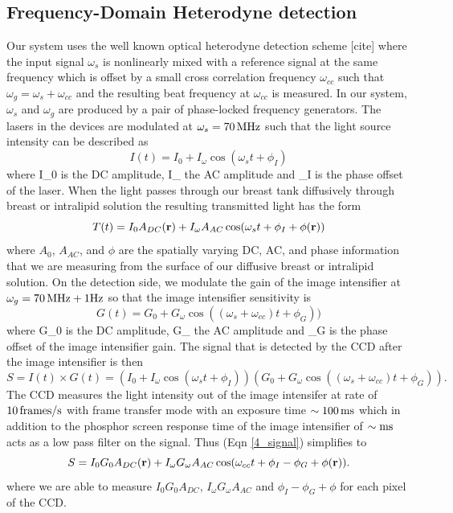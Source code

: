 \subsection{Frequency-Domain Heterodyne detection}
\label{sec:heterodyne}
Our system uses the well known optical heterodyne detection scheme [cite] where the input signal $\omega_{s}$ is nonlinearly mixed with a reference signal at the same frequency which is offset by a small cross correlation frequency $\omega_{cc}$ such that $\omega_{g}=\omega_{s}+\omega_{cc}$ and the resulting beat frequency at $\omega_{cc}$ is measured.  In our system, $\omega_{s}$ and  $\omega_{g}$ are produced by a pair of phase-locked frequency generators. The lasers in the devices are modulated at $\omega_{s}=70\,{\rm MHz}$ such that the light source intensity can be described as
\begin{equation}
I(t) = I_{0} + I_{\omega}\cos(\omega_s t+\phi_I)
\end{equation}
where  I_{0} is the DC amplitude, I_{\omega} the AC amplitude and \phi_I is the phase offset of the laser. When the light passes through our breast tank diffusively through breast or intralipid solution the resulting transmitted light has the form
\begin{equation}
T(t) = I_{0}A_{DC}({\bf r}) + I_{\omega}A_{AC}\cos(\omega_s t +\phi_I+ \phi({\bf r}))
\end{equation}
where $A_0$, $A_{AC}$, and $\phi$ are the spatially varying DC, AC, and phase information that we are measuring from the surface of our diffusive breast or intralipid solution. On the detection side, we modulate the gain of the image intensifier at $\omega_{g}=70\,{\rm MHz} + 1 {\rm Hz}$ so that the image intensifier sensitivity is
\begin{equation}
G(t) = G_{0} +G_{\omega} \cos((\omega_s+\omega_{cc})t+\phi_G))
\end{equation}
\noindent
where  G_{0} is the DC amplitude, G_{\omega} the AC amplitude and \phi_G is the phase offset of the image intensifier gain. The signal that is detected by the CCD after the image intensifier is then
\begin{equation}
S = I(t) \times G(t) = (I_{0} + I_{\omega}\cos(\omega_s t+\phi_I))(G_{0} +G_{\omega}\cos((\omega_s+\omega_{cc})t+\phi_G)).
\label{4_signal}
\end{equation}
The CCD measures the light intensity out of the image intensifer at rate of $10\, {\rm frames/s}$ with frame transfer mode with an exposure time $\sim100\, {\rm ms}$ which in addition to the phosphor screen response time of the image intensifier of $\sim{\rm ms}$ acts as a low pass filter on the signal. Thus (Eqn \ref{4_signal}) simplifies to
\begin{equation}
\label{eqn:heterodyne}
S  = I_{0}G_{0}A_{DC}({\bf r}) + I_{\omega}G_{\omega}A_{AC}\cos(\omega_{cc}t+\phi_I-\phi_G+\phi({\bf r})).
\end{equation}
where we are able to measure $I_{0}G_{0}A_{DC},\,I_{\omega}G_{\omega}A_{AC}$ and $\phi_I-\phi_G+\phi$ for each pixel of the CCD.

